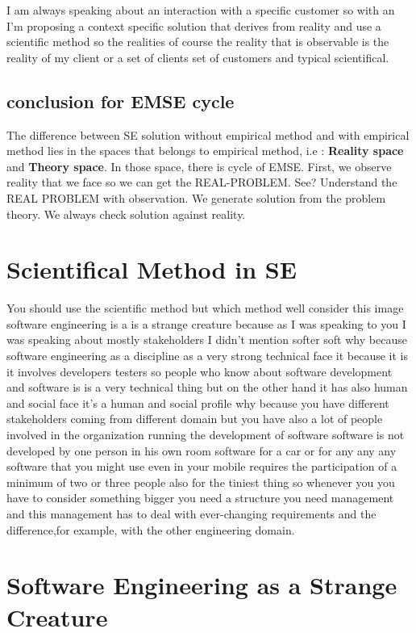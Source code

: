 \documentclass[conference, compsoc, twoside]{IEEEtran}
\begin{document}
I am always speaking about an interaction with a specific customer so with an I'm proposing a context specific solution that derives from reality and use a scientific method so the realities of course the reality that is observable is the reality of my client or a set of clients set of customers and typical scientifical. 

\subsection{conclusion for EMSE cycle} %
\label{sub:conclusion_for_emse_cycle}
The difference between SE solution without empirical method and with empirical method lies in the spaces that belongs to empirical method, i.e : 
\textbf{Reality space} and \textbf{Theory space}.
In those space, there is cycle of EMSE. 
First, we observe reality that we face so we can get the REAL-PROBLEM. See? Understand the REAL PROBLEM with observation. We generate  solution from the problem theory. We always check solution against reality.
 \section{Scientifical Method in SE} %
 \label{sec:scientifical_method_in_se}
 You should use the scientific method but which method well consider this image software engineering is a is a strange creature because as I was speaking to you I was speaking about mostly stakeholders I didn't mention softer soft why because software engineering as a discipline as a very strong technical face it because it is it involves developers testers so people who know about software development and software is is a very technical thing but on the other hand it has also human and social face it's a human and social profile why because you have different stakeholders coming from different domain but you have also a lot of people involved in the organization running the development of software software is not developed by one person in his own room software for a car or for any any any software that you might use even in your mobile requires the participation of a minimum of two or three people also for the tiniest thing so whenever you you have to consider something bigger you need a structure you need management and this management has to deal with ever-changing requirements and the difference,for example, with the other engineering domain.
\section{Software Engineering as a Strange Creature}
\end{document}
